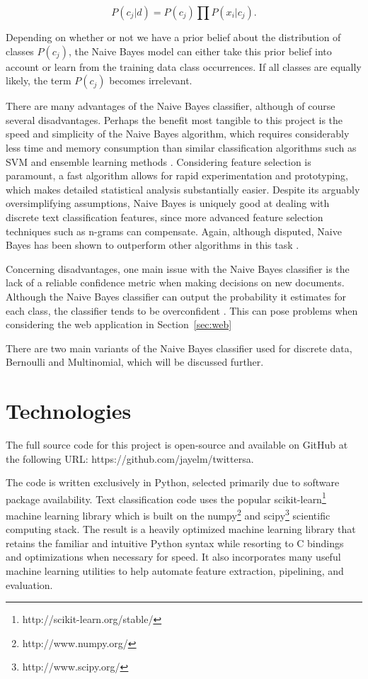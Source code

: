\documentclass[letter,12pt]{article}
\begin{document}
\begin{equation}
  P(c_j | d) = P(c_j) \prod P(x_i | c_j).
\end{equation}

Depending on whether or not we have a prior belief about the distribution of
classes $P(c_j)$, the Naive Bayes model can either take this prior belief into
account or learn from the training data class occurrences. If all classes are
equally likely, the term $P(c_j)$ becomes irrelevant.

There are many advantages of the Naive Bayes classifier, although of course
several disadvantages. Perhaps the benefit most tangible to this project is the
speed and simplicity of the Naive Bayes algorithm, which requires considerably
less time and memory consumption than similar classification algorithms such as
SVM and ensemble learning methods \cite{huang03}. Considering feature selection
is paramount, a fast algorithm allows for rapid experimentation and
prototyping, which makes detailed statistical analysis substantially easier.
Despite its arguably oversimplifying assumptions, Naive Bayes is uniquely good
at dealing with discrete text classification features, since more advanced
feature selection techniques such as n-grams can compensate. Again, although
disputed, Naive Bayes has been shown to outperform other algorithms in this
task \cite{narayanan13,pak10}.

Concerning disadvantages, one main issue with the Naive Bayes classifier is the
lack of a reliable confidence metric when making decisions on new documents.
Although the Naive Bayes classifier can output the probability it estimates for
each class, the classifier tends to be overconfident \cite{rennie01}. This can
pose problems when considering the web application in Section~\ref{sec:web}

There are two main variants of the Naive Bayes classifier used for
discrete data, Bernoulli and Multinomial, which will be discussed further.

\section{Technologies}

The full source code for this project is open-source and available on GitHub at the following
URL:
https://github.com/jayelm/twittersa.

The code is written exclusively in Python, selected primarily due to software
package availability. Text classification code uses the popular
scikit-learn\footnote{http://scikit-learn.org/stable/} machine learning library
which is built on the numpy\footnote{http://www.numpy.org/} and
scipy\footnote{http://www.scipy.org/} scientific computing stack. The result is
a heavily optimized machine learning library that retains the familiar and
intuitive Python syntax while resorting to C bindings and optimizations when
necessary for speed. It also incorporates many useful machine learning
utilities to help automate feature extraction, pipelining, and evaluation.
\end{document}
